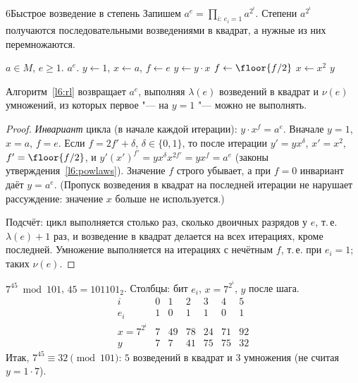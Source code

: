 \begin{lecture}{6}{Быстрое возведение в степень}
Запишем $a^e = \prod_{i:\, e_i = 1} a^{2^i}$. Степени $a^{2^i}$ получаются последовательными
возведениями в квадрат, а нужные из них перемножаются.

\begin{algorithm}\label{l6:rl}
\begin{algorithmic}[1]
\Require $a \in M$, $e \ge 1$.
\Ensure $a^e$.
\State $y \gets 1$, $x \gets a$, $f \gets e$
   $y \gets y \cdot x$ \EndIf
  \State $f \gets \floor{f/2}$
   $x \gets x^2$ \EndIf
\EndWhile
\State \Return $y$
\end{algorithmic}
\end{algorithm}

\begin{theorem}\label{l6:rl-correct}
Алгоритм~\ref{l6:rl} возвращает $a^e$, выполняя $\lambda(e)$ возведений в квадрат и $\nu(e)$
умножений, из которых первое "--- на $y = 1$ "--- можно не выполнять.
\end{theorem}

\begin{proof}
\emph{Инвариант} цикла (в начале каждой итерации): $y \cdot x^f = a^e$. Вначале $y = 1$, $x = a$,
$f = e$. Если $f = 2f' + \delta$, $\delta \in \{0, 1\}$, то после итерации
$y' = y x^\delta$, $x' = x^2$, $f' = \floor{f/2}$, и
$y' (x')^{f'} = y x^{\delta} x^{2f'} = y x^f = a^e$ (законы
утверждения~\ref{l6:powlaws}). Значение $f$ строго убывает, а при $f = 0$ инвариант даёт
$y = a^e$. (Пропуск возведения в квадрат на последней итерации не нарушает рассуждение:
значение $x$ больше не используется.)

Подсчёт: цикл выполняется столько раз, сколько двоичных разрядов у $e$, т.\,е. $\lambda(e) + 1$
раз, и возведение в квадрат делается на всех итерациях, кроме последней. Умножение
выполняется на итерациях с нечётным $f$, т.\,е. при $e_i = 1$; таких $\nu(e)$.
\end{proof}

\begin{example}\label{l6:ex-rl}
$7^{45} \bmod 101$, $45 = 101101_2$. Столбцы: бит $e_i$, $x = 7^{2^i}$, $y$ после шага.
\[
\begin{array}{c|cccccc}
  i & 0 & 1 & 2 & 3 & 4 & 5 \\ \hline
  e_i & 1 & 0 & 1 & 1 & 0 & 1 \\
  x = 7^{2^i} & 7 & 49 & 78 & 24 & 71 & 92 \\
  y & 7 & 7 & 41 & 75 & 75 & 32
\end{array}
\]
Итак, $7^{45} \equiv 32 \pmod{101}$: $5$ возведений в квадрат и $3$ умножения
(не считая $y = 1 \cdot 7$).
\end{example}


\end{lecture}
